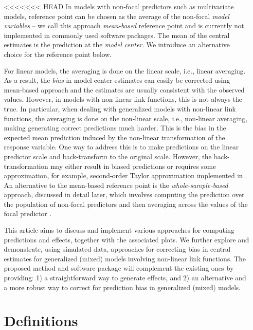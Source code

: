<<<<<<< HEAD
In models with non-focal predictors such as multivariate models, reference point can be chosen as the average of the non-focal \emph{model variables} -- we call this approach \emph{mean-based} reference point and is currently not implemented in commonly used  software packages. The mean of the central estimates is the prediction at the \emph{model center}. We introduce an alternative choice for the reference point below.

For linear models, the averaging is done on the linear scale, i.e., linear averaging. As a result, the \emph{bias} in model center estimates can easily be corrected using mean-based approach and the estimates are usually consistent with the observed values. However, in models with non-linear link functions, this is not always the true. In particular, when dealing with generalized models with non-linear link functions, the averaging is done on the non-linear scale, i.e., non-linear averaging, making generating correct predictions much harder. This is the bias in the expected mean prediction induced by the non-linear transformation of the response variable. One way to address this is to make predictions on the linear predictor scale and back-transform to the original scale. However, the back-transformation may either result in biased predictions or requires some approximation, for example, second-order Taylor approximation implemented in  \citep{lenth2018package}. An alternative to the mean-based reference point is the \emph{whole-sample-based} approach, discussed in detail later, which involves computing the prediction over the population of non-focal predictors and then averaging across the values of the focal predictor \citep{hanmer2013behind}. 

This article aims to discuss and implement various approaches for computing predictions and effects, together with the associated plots. We further explore and demonstrate, using simulated data, approaches for correcting bias in central estimates for generalized (mixed) models involving non-linear link functions. The proposed method and  software package will complement the existing ones by providing: 1) a straightforward way to generate effects, and 2) an alternative and a more robust way to correct for prediction bias in generalized (mixed) models.


\section{Definitions}

